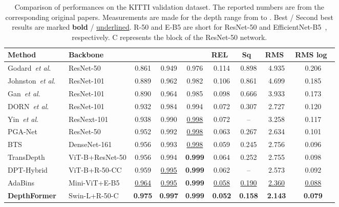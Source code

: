 \documentclass[twocolumn]{svjour3}    \pdfoutput=1
\newcommand{\etal}{\textit{et al}. }
\begin{document}
         \begin{table*}[t]
    \centering
        \begin{tabularx}{\textwidth}{@{}ll*{6}{C}c@{}}
            \toprule
            Method & Backbone & \textbf{} & \textbf{} & \textbf{} & REL~ & Sq~ & RMS~ & RMS log~\\
            \midrule
Godard~\etal~\citep{godard2017unsupervised}  & ResNet-50 & 0.861 & 0.949 & 0.976 & 0.114   & 0.898  & 4.935 & 0.206\\
            Johnston~\etal~\citep{johnston2020self} & ResNet-101 & 0.889 & 0.962 & 0.982 & 0.106 & 0.861 & 4.699 & 0.185\\
            Gan~\etal~\citep{gan2018monocular} & ResNet-101 & 0.890 & 0.964 & 0.985 & 0.098   & 0.666  & 3.933 & 0.173\\
DORN~\etal~\citep{fu2018deep}  & ResNet-101 & 0.932 & 0.984 & 0.994 & 0.072   & 0.307  & 2.727 & 0.120\\
            Yin~\etal~\citep{yin2019enforcing}  & ResNext-101 & 0.938 & 0.990  & \underline{0.998} & 0.072 & -- & 3.258 & 0.117\\
            PGA-Net~\citep{xu2020probabilistic} & ResNet-50 & 0.952 & 0.992 & \underline{0.998} & 0.063 & 0.267 & 2.634 & 0.101\\
            BTS~\citep{lee2019bts}  &DenseNet-161& 0.956 & 0.993 & \underline{0.998} & 0.059   & 0.245  & 2.756 & 0.096\\
            TransDepth~\citep{yang2021transdepth}& ViT-B+ResNet-50& 0.956 & 0.994 & \textbf{0.999} & 0.064 & 0.252  & 2.755 & 0.098\\
            DPT-Hybrid~\citep{ranftl2021dpt} &ViT-B+R-50-CC& 0.959 & \underline{0.995} & \textbf{0.999} & 0.062 & --& 2.573 & 0.092\\
            AdaBins~\citep{bhat2021adabins} &Mini-ViT+E-B5& \underline{0.964} & \underline{0.995} & \textbf{0.999} & \underline{0.058}  & \underline{0.190}  & \underline{2.360} & \underline{0.088}\\
            \midrule
            \textbf{DepthFormer} & Swin-L+R-50-C & \textbf{0.975} & \textbf{0.997} & \textbf{0.999} & \textbf{0.052} & \textbf{0.158} & \textbf{2.143} & \textbf{0.079} \\ 
            \bottomrule
        \end{tabularx} 
    \vspace{-0.1cm}
\caption{Comparison of performances on the KITTI validation dataset. The reported numbers are from the corresponding original papers. Measurements are made for the depth range from  to . Best / Second best results are marked \textbf{bold} / \underline{underlined}. R-50 and E-B5 are short for ResNet-50 and EfficientNet-B5~\citep{tan2019efficientnet}, respectively. C represents the  block of the ResNet-50 network.}
\vspace{-0.1cm}
    \label{tab:results-kitti-val}
\end{table*}
         
\end{document}
